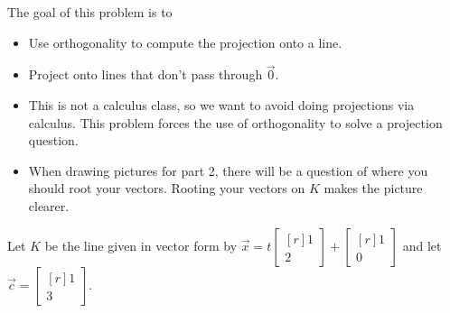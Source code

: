\documentclass{problemset}
\newcommand{\mat}[1]{\begin{bmatrix*}[r]#1\end{bmatrix*}}
\begin{document}
	\question
	\begin{annotation}
		\begin{goals}

			The goal of this problem is to
			\begin{itemize}
				\item Use orthogonality to compute the projection onto a line.
				\item Project onto lines that don't pass through $\vec 0$.
			\end{itemize}
		\end{goals}

		\begin{notes}
			\begin{itemize}
				\item This is not a calculus class, so we want to avoid
					doing projections via calculus. This problem forces
					the use of orthogonality to solve a projection question.
				\item When drawing pictures for part 2, there will be a question
					of where you should root your vectors. Rooting your vectors
					on $K$ makes the picture clearer.
			\end{itemize}
		\end{notes}
	\end{annotation}
	Let $K$ be the line given in vector form by $\vec x=t\mat{1\\2}+\mat{1\\0}$ and let
	$\vec c=\mat{1\\3}$.
\end{document}
